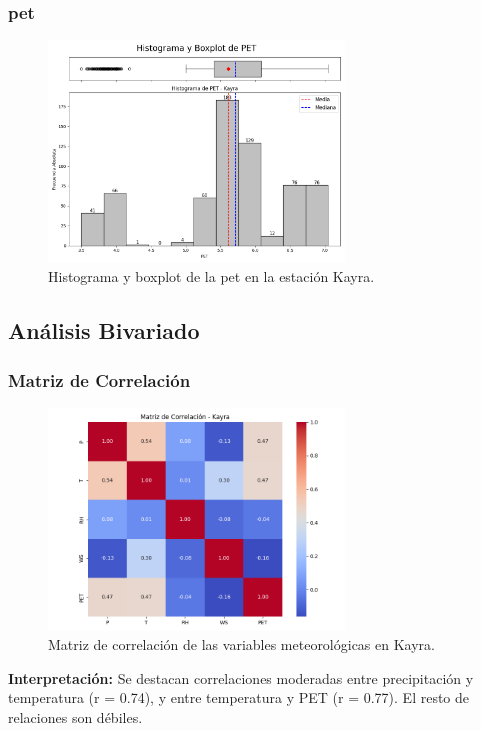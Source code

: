 \subsubsection*{\gls{pet} }
\begin{figure}[htbp]
\centering
\includegraphics[width=0.7\textwidth]{resultados/por_estacion_meteorologica/Kayra/PET_histograma.png}
\caption{Histograma y boxplot de la \gls{pet}  en la estación Kayra.}
\label{fig:kayra_PET}
\end{figure}

\subsection{Análisis Bivariado}

\subsubsection*{Matriz de Correlación}
\begin{figure}[htbp]
\centering
\includegraphics[width=0.7\textwidth]{resultados/por_estacion_meteorologica/Kayra/matriz_correlacion.png}
\caption{Matriz de correlación de las variables meteorológicas en Kayra.}
\label{fig:kayra_corr}
\end{figure}
\textbf{Interpretación:} Se destacan correlaciones moderadas entre precipitación y temperatura (r = 0.74), y entre temperatura y PET (r = 0.77). El resto de relaciones son débiles.

